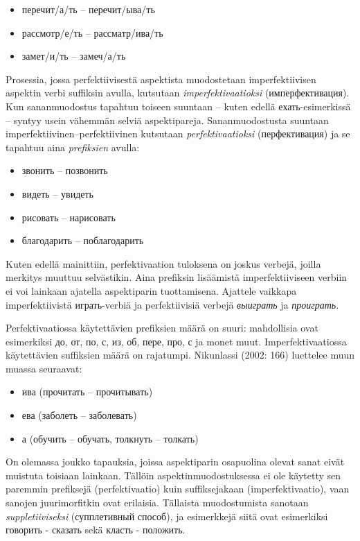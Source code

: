 \documentclass[]{scrreprt}
\providecommand{\tightlist}{%
  \setlength{\itemsep}{0pt}\setlength{\parskip}{0pt}}
\begin{document}
\begin{itemize}
\tightlist
\item
  перечит/а/ть -- перечит/ыва/ть
\item
  рассмотр/е/ть -- рассматр/ива/ть
\item
  замет/и/ть -- замеч/а/ть
\end{itemize}

Prosessia, jossa perfektiivisestä aspektista muodostetaan
imperfektiivisen aspektin verbi suffiksin avulla, kutsutaan
\emph{imperfektivaatioksi} (имперфективация). Kun sananmuodostus
tapahtuu toiseen suuntaan -- kuten edellä ехать-esimerkissä -- syntyy
usein vähemmän selviä aspektipareja. Sananmuodostusta suuntaan
imperfektiivinen--perfektiivinen kutsutaan \emph{perfektivaatioksi}
(перфективация) ja se tapahtuu aina \emph{prefiksien} avulla:

\begin{itemize}
\tightlist
\item
  звонить -- позвонить
\item
  видеть -- увидеть
\item
  рисовать -- нарисовать
\item
  благодарить -- поблагодарить
\end{itemize}

Kuten edellä mainittiin, perfektivaation tuloksena on joskus verbejä,
joilla merkitys muuttuu selvästikin. Aina prefiksin lisäämistä
imperfektiiviseen verbiin ei voi lainkaan ajatella aspektiparin
tuottamisena. Ajattele vaikkapa imperfektiivistä играть-verbiä ja
perfektiivisiä verbejä \emph{выиграть} ja \emph{проиграть}.

Perfektivaatiossa käytettävien prefiksien määrä on suuri: mahdollisia
ovat esimerkiksi до, от, по, с, из, об, пере, про, с ja monet muut.
Imperfektivaatiossa käytettävien suffiksien määrä on rajatumpi.
Nikunlassi (2002: 166) luettelee muun muassa seuraavat:

\begin{itemize}
\tightlist
\item
  ива (прочитать -- прочитывать)
\item
  ева (заболеть -- заболевать)
\item
  а (обучить -- обучать, толкнуть -- толкать)
\end{itemize}

On olemassa joukko tapauksia, joissa aspektiparin osapuolina olevat
sanat eivät muistuta toisiaan lainkaan. Tällöin aspektinmuodostuksessa
ei ole käytetty sen paremmin prefiksejä (perfektivaatio) kuin
suffiksejakaan (imperfektivaatio), vaan sanojen juurimorfitkin ovat
erilaisia. Tällaista muodostumista sanotaan \emph{suppletiiviseksi}
(супплетивный способ), ja esimerkkejä siitä ovat esimerkiksi говорить -
сказать sekä класть - положить.
\end{document}
